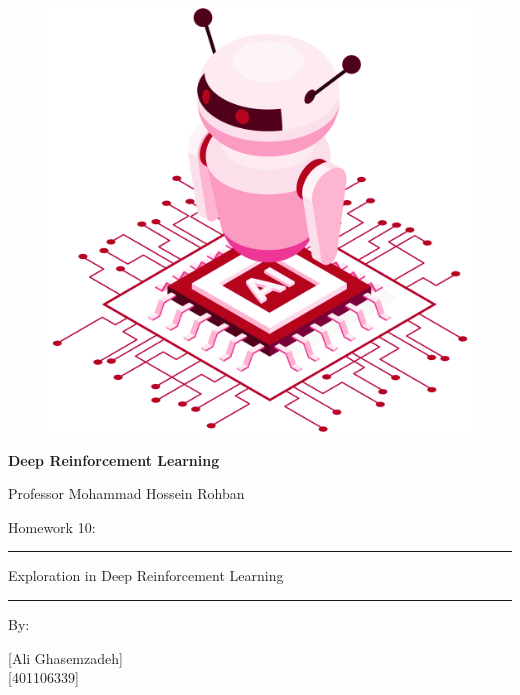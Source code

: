 \documentclass[12pt]{article}
\begin{document}
\thispagestyle{plain}

\begin{center}

\vspace*{-1.5cm}
\begin{figure}[!h]
    \centering
    \includegraphics[width=0.7\linewidth]{figs/cover-std.png}
\end{figure}

{

{\color{DarkBlue} {\fontsize{30}{50} \textbf{
Deep Reinforcement Learning
}}}

{\color{DarkBlue} {\Large
Professor Mohammad Hossein Rohban
}}
}


\vspace{20pt}

{


{\color{RedOrange}
{\Large
Homework 10:
}\\
}
{\color{BrickRed}
\rule{12cm}{0.5pt}

{\Huge
Exploration in Deep Reinforcement Learning
}
\rule{12cm}{0.5pt}
}

\vspace{10pt}

{\color{RoyalPurple} { \small By:} } \\
\vspace{10pt}

{\color{Blue} { \LARGE [Ali Ghasemzadeh] } } \\
\vspace{5pt}
{\color{RoyalBlue} { \Large [401106339] } }


}
\end{center}
\end{document}
